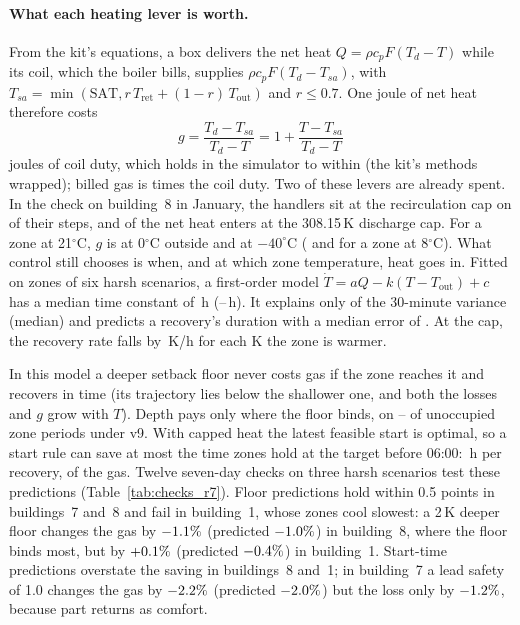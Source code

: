 \documentclass{article}
\begin{document}
\paragraph{What each heating lever is worth.}
From the kit's equations, a box delivers the net heat $Q=\rho c_p F (T_d - T)$ while its coil, which the boiler bills, supplies $\rho c_p F (T_d - T_{sa})$, with $T_{sa}=\min(\text{SAT}, r\,T_{\text{ret}} + (1-r)\,T_{\text{out}})$ and $r\le 0.7$. One joule of net heat therefore costs
\begin{equation}
g = \frac{T_d - T_{sa}}{T_d - T} = 1 + \frac{T - T_{sa}}{T_d - T}
\label{eq:g}
\end{equation}
joules of coil duty, which holds in the simulator to within \RSevGErr{} (the kit's methods wrapped); billed gas is \RSevGasOverCoil{} times the coil duty.
Two of these levers are already spent. In the check on building~8 in January, the handlers sit at the recirculation cap on \RSevRecircCapShare{} of their steps, and \RSevCapHeatShare{} of the net heat enters at the 308.15\,K discharge cap. For a zone at 21$^\circ$C, $g$ is \RSevGZero{} at 0$^\circ$C outside and \RSevGMinusForty{} at $-40^\circ$C (\RSevGColdZero{} and \RSevGColdMinusForty{} for a zone at 8$^\circ$C). What control still chooses is when, and at which zone temperature, heat goes in. Fitted on \RSevNZones{} zones of six harsh scenarios, a first-order model $\dot T = aQ - k(T - T_{\text{out}}) + c$ has a median time constant of \RSevTauMed\,h (\RSevTauLo--\RSevTauHi\,h). It explains only \RSevRTwo{} of the 30-minute variance (median) and predicts a recovery's duration with a median error of \RSevRecErr. At the cap, the recovery rate falls by \RSevRateSlope\,K/h for each K the zone is warmer.

In this model a deeper setback floor never costs gas if the zone reaches it and recovers in time (its trajectory lies below the shallower one, and both the losses and $g$ grow with $T$). Depth pays only where the floor binds, on \RSevBindLo--\RSevBindHi{} of unoccupied zone periods under v9. With capped heat the latest feasible start is optimal, so a start rule can save at most the time zones hold at the target before 06:00: \RSevHoldH\,h per recovery, \RSevHoldGas{} of the gas. Twelve seven-day checks on three harsh scenarios test these predictions (Table~\ref{tab:checks_r7}). Floor predictions hold within 0.5 points in buildings~7 and~8 and fail in building~1, whose zones cool slowest: a 2\,K deeper floor changes the gas by $-1.1\%$ (predicted $-1.0\%$) in building~8, where the floor binds most, but by $+0.1\%$ (predicted $-0.4\%$) in building~1. Start-time predictions overstate the saving in buildings~8 and~1; in building~7 a lead safety of 1.0 changes the gas by $-2.2\%$ (predicted $-2.0\%$) but the loss only by $-1.2\%$, because part returns as comfort.
\end{document}
